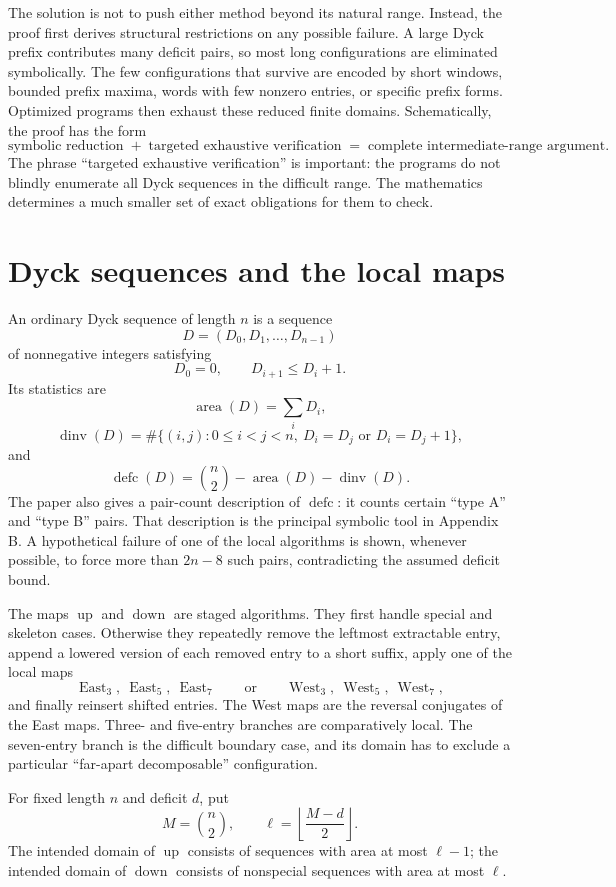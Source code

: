 \documentclass{article}
\newcommand{\area}{\operatorname{area}}
\newcommand{\dinv}{\operatorname{dinv}}
\newcommand{\defc}{\operatorname{defc}}
\newcommand{\upmap}{\operatorname{up}}
\newcommand{\downmap}{\operatorname{down}}
\newcommand{\East}{\operatorname{East}}
\newcommand{\West}{\operatorname{West}}
\begin{document}
The solution is not to push either method beyond its natural range.  Instead,
the proof first derives structural restrictions on any possible failure.  A
large Dyck prefix contributes many deficit pairs, so most long configurations
are eliminated symbolically.  The few configurations that survive are encoded
by short windows, bounded prefix maxima, words with few nonzero entries, or
specific prefix forms.  Optimized programs then exhaust these reduced finite
domains.  Schematically, the proof has the form
\[
  \text{symbolic reduction}
  \; + \;
  \text{targeted exhaustive verification}
  \; = \;
  \text{complete intermediate-range argument}.
\]
The phrase ``targeted exhaustive verification'' is important: the programs do
not blindly enumerate all Dyck sequences in the difficult range.  The
mathematics determines a much smaller set of exact obligations for them to
check.

\section{Dyck sequences and the local maps}

An ordinary Dyck sequence of length $n$ is a sequence
\[
  D=(D_0,D_1,\ldots,D_{n-1})
\]
of nonnegative integers satisfying
\[
  D_0=0,
  \qquad
  D_{i+1}\leq D_i+1.
\]
Its statistics are
\[
  \area(D)=\sum_i D_i,
\]
\[
  \dinv(D)
  =\#\{(i,j):0\leq i<j<n,
      \ D_i=D_j\text{ or }D_i=D_j+1\},
\]
and
\[
  \defc(D)=\binom n2-\area(D)-\dinv(D).
\]
The paper also gives a pair-count description of $\defc$: it counts certain
``type A'' and ``type B'' pairs.  That description is the principal symbolic
tool in Appendix B.  A hypothetical failure of one of the local algorithms is
shown, whenever possible, to force more than $2n-8$ such pairs, contradicting
the assumed deficit bound.

The maps $\upmap$ and $\downmap$ are staged algorithms.  They first handle
special and skeleton cases.  Otherwise they repeatedly remove the leftmost
extractable entry, append a lowered version of each removed entry to a short
suffix, apply one of the local maps
\[
  \East_3,\ \East_5,\ \East_7
  \qquad\text{or}\qquad
  \West_3,\ \West_5,\ \West_7,
\]
and finally reinsert shifted entries.  The West maps are the reversal
conjugates of the East maps.  Three- and five-entry branches are comparatively
local.  The seven-entry branch is the difficult boundary case, and its domain
has to exclude a particular ``far-apart decomposable'' configuration.

For fixed length $n$ and deficit $d$, put
\[
  M=\binom n2,
  \qquad
  \ell=\left\lfloor\frac{M-d}{2}\right\rfloor.
\]
The intended domain of $\upmap$ consists of sequences with area at most
$\ell-1$; the intended domain of $\downmap$ consists of nonspecial sequences
with area at most $\ell$.
\end{document}
